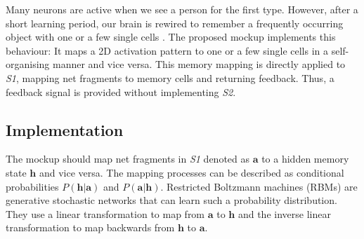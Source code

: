 Many neurons are active when we see a person for the first type.
However, after a short learning period, our brain is rewired to remember a frequently occurring object with one or a few single cells .
The proposed mockup implements this behaviour: It maps a 2D activation pattern to one or a few single cells in a self-organising manner and vice versa.
This memory mapping is directly applied to \emph{S1}, mapping net fragments to memory cells and returning feedback.
Thus, a feedback signal is provided without implementing \emph{S2}.



\subsection{Implementation}
The mockup should map net fragments in \emph{S1} denoted as $\boldsymbol{a}$ to a hidden memory state $\boldsymbol{h}$ and vice versa. The mapping processes can be described as conditional probabilities $P(\boldsymbol{h}|\boldsymbol{a})$ and $P(\boldsymbol{a}|\boldsymbol{h})$.
Restricted Boltzmann machines (RBMs)  are generative stochastic networks that can learn such a probability distribution.
They use a linear transformation to map from $\boldsymbol{a}$ to $\boldsymbol{h}$ and the inverse linear transformation to map backwards from $\boldsymbol{h}$ to $\boldsymbol{a}$.


